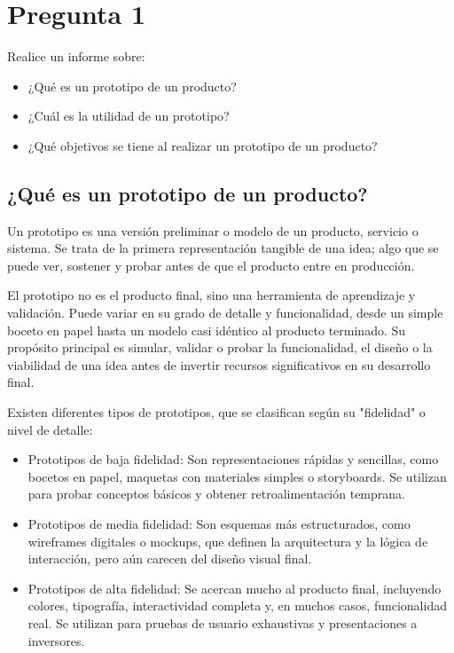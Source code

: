 \section*{Pregunta 1}
\noindent Realice un informe sobre:

\begin{itemize}
  \item[a] ¿Qué es un prototipo de un producto?

  \item[b] ¿Cuál es la utilidad de un prototipo?

  \item[c] ¿Qué objetivos se tiene al realizar un prototipo de un producto?
\end{itemize}

\subsection*{¿Qué es un prototipo de un producto?}
\noindent Un prototipo es una versión preliminar o modelo de un
producto, servicio o sistema. Se trata de la primera representación
tangible de una idea; algo que se puede ver, sostener y probar antes
de que el producto entre en producción.

\noindent El prototipo no es el producto final, sino una herramienta
de aprendizaje y validación. Puede variar en su grado de detalle y
funcionalidad, desde un simple boceto en papel hasta un modelo casi
idéntico al producto terminado. Su propósito principal es simular,
validar o probar la funcionalidad, el diseño o la viabilidad de una
idea antes de invertir recursos significativos en su desarrollo final.

\noindent Existen diferentes tipos de prototipos, que se clasifican
según su "fidelidad" o nivel de detalle:

\begin{itemize}
  \item Prototipos de baja fidelidad: Son representaciones rápidas y
    sencillas, como bocetos en papel, maquetas con materiales simples
    o storyboards. Se utilizan para probar conceptos básicos y
    obtener retroalimentación temprana.

  \item Prototipos de media fidelidad: Son esquemas más
    estructurados, como wireframes digitales o mockups, que definen
    la arquitectura y la lógica de interacción, pero aún carecen del
    diseño visual final.

  \item Prototipos de alta fidelidad: Se acercan mucho al producto
    final, incluyendo colores, tipografía, interactividad completa y,
    en muchos casos, funcionalidad real. Se utilizan para pruebas de
    usuario exhaustivas y presentaciones a inversores.
\end{itemize}

